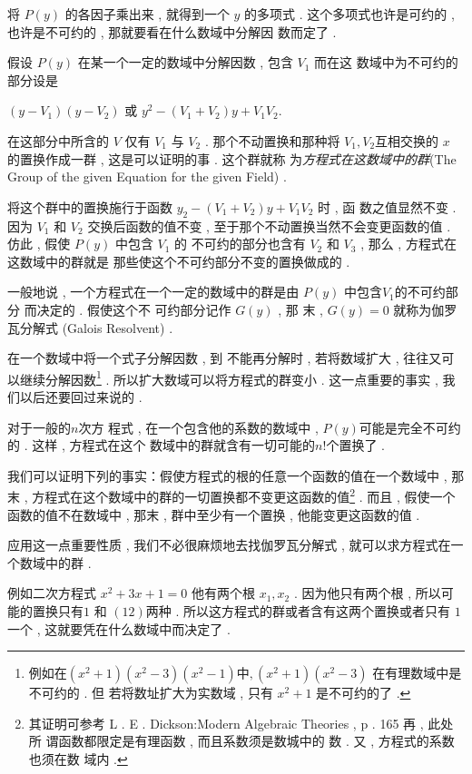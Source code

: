 将 $P(y)$ 的各因子乘出来 , 就得到一个 $y$ 的多项式 . 这个多项式也许是可约的 , 也许是不可约的 , 那就要看在什么数域中分解因 数而定了 . 

假设 $P(y)$ 在某一个一定的数域中分解因数 , 包含 $V_{1}$ 而在这 数域中为不可约的部分设是

$\left(y-V_{1}\right)\left(y-V_{2}\right)$ 或 $y^{2}-\left(V_{1}+V_{2}\right) y+V_{1} V_{2}  . $

在这部分中所含的 $V$ 仅有 $V_{1}$ 与 $V_{2}$ .  那个不动置换和那种将 $V_{1} ,  V_{2}$互相交换的 $x$ 的置换作成一群 , 这是可以证明的事 . 这个群就称
为\emph{方程式在这数域中的群}(The Group of the given Equation for
the given Field) . 

将这个群中的置换施行于函数 $y_{2}-\left(V_{1}+V_{2}\right) y+V_{1} V_{2}$ 时 , 函 数之值显然不变 . 因为 $V_{1}$ 和 $V_{2}$ 交换后函数的值不变 , 至于那个不动置换当然不会变更函数的值 . 仿此 , 假使 $P(y)$ 中包含 $V_{1}$ 的
不可约的部分也含有 $V_{2}$ 和 $V_{3}$ ,  那么 ,  方程式在这数域中的群就是
那些使这个不可约部分不变的置换做成的 . 

一般地说 , 一个方程式在一个一定的数域中的群是由 $P(y)$ 中包含$V_1$的不可约部分 而决定的 . 假使这个不 可约部分记作 $G(y)$ ,  那 末 ,  $G(y)=0$ 就称为伽罗瓦分解式 (Galois Resolvent) . 

在一个数域中将一个式子分解因数 , 到 不能再分解时 , 若将数域扩大 , 往往又可以继续分解因数\footnote{例如在$\left(x^{2}+1\right)\left(x^{2}-3\right)\left(x^{2}-1\right) 中 , \left(x^{2}+1\right)\left(x^{2}-3\right)$ 在有理数域中是不可约的 . 但 若将数址扩大为实数域 ,  只有 $x^{2}+1$ 是不可约的了 . } . 所以扩大数域可以将方程式的群变小 . 这一点重要的事实 , 我们以后还要回过来说的 . 

对于一般的$n$次方 程式 , 在一个包含他的系数的数域中 ,  $P(y)$可能是完全不可约的 . 这样 , 方程式在这个 数域中的群就含有一切可能的$n!$个置换了 . 

我们可以证明下列的事实：假使方程式的根的任意一个函数的值在一个数域中 , 那末 , 方程式在这个数域中的群的一切置换都不变更这函数的值\footnote{其证明可参考 L . E . Dickson:Modern Algebraic Theories , p . 165 再 , 此处所 谓函数都限定是有理函数 ,  而且系数须是数城中的 数 . 又 , 方程式的系数也须在数 域内 . } . 而且 , 假使一个函数的值不在数域中 , 那末 ,  群中至少有一个置换 , 他能变更这函数的值 . 

应用这一点重要性质 , 我们不必很麻烦地去找伽罗瓦分解式 ,  就可以求方程式在一个数域中的群 . 

例如二次方程式
$x^{2}+3 x+1=0$
他有两个根 $x_{1} ,  x_{2}$  . 因为他只有两个根 , 所以可能的置换只有$ 1$ 和
$(12)$两种 . 所以这方程式的群或者含有这两个置换或者只有 $1$ 一个 , 这就要凭在什么数域中而决定了 . 

